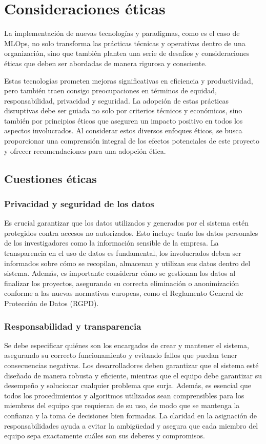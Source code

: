 \section{Consideraciones éticas}
La implementación de nuevas tecnologías y paradigmas, como 
es el caso de MLOps, no solo transforma las prácticas técnicas y 
operativas dentro de una organización, sino que también plantea una 
serie de desafíos y consideraciones éticas que deben ser abordadas 
de manera rigurosa y consciente.\medskip

Estas tecnologías prometen mejoras significativas en eficiencia 
y productividad, pero también traen consigo preocupaciones en 
términos de equidad, responsabilidad, privacidad y seguridad. La 
adopción de estas prácticas disruptivas debe ser guiada no solo 
por criterios técnicos y económicos, sino también por principios 
éticos que aseguren un impacto positivo en todos los aspectos 
involucrados. Al considerar estos diversos enfoques éticos, se 
busca proporcionar una comprensión integral de los efectos 
potenciales de este proyecto y ofrecer recomendaciones para 
una adopción ética.

\subsection{Cuestiones éticas}
\subsubsection{Privacidad y seguridad de los datos}
Es crucial garantizar que los datos utilizados y generados por el 
sistema estén protegidos contra accesos no autorizados. Esto incluye 
tanto los datos personales de los investigadores como la información sensible 
de la empresa. La transparencia en el uso de datos es fundamental, 
los involucrados deben ser informados sobre cómo se recopilan, almacenan 
y utilizan sus datos dentro del sistema. Además, es importante considerar 
cómo se gestionan los datos al finalizar los proyectos, asegurando su correcta 
eliminación o anonimización conforme a las nuevas normativas europeas, 
como el Reglamento General de Protección de Datos (RGPD).

\subsubsection{Responsabilidad y transparencia}
Se debe especificar quiénes son los encargados de crear y mantener el sistema, 
asegurando su correcto funcionamiento y evitando fallos que puedan tener 
consecuencias negativas. Los desarrolladores deben garantizar que el sistema esté 
diseñado de manera robusta y eficiente, mientras que el equipo debe garantizar su desempeño 
y solucionar cualquier problema que surja. Además, es esencial que todos los procedimientos 
y algoritmos utilizados sean comprensibles para los miembros del equipo que requieran de su uso, 
de modo que se mantenga la confianza y la toma de decisiones bien formadas. La claridad en la 
asignación de responsabilidades ayuda a evitar la ambigüedad y asegura que cada miembro del 
equipo sepa exactamente cuáles son sus deberes y compromisos.

